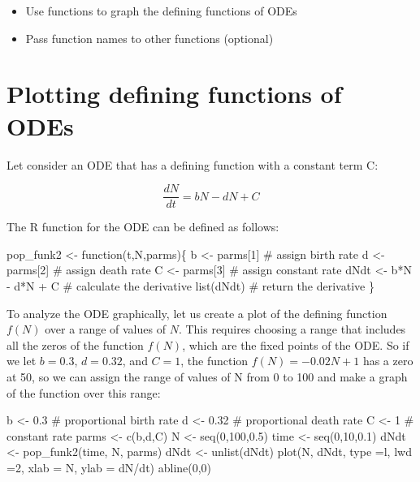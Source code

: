 \documentclass[
  letterpaper,
  DIV=11,
  numbers=noendperiod]{scrreprt}
\newenvironment{Shaded}{\begin{snugshade}}{\end{snugshade}}
\newcommand{\NormalTok}[1]{\textcolor[rgb]{0.00,0.23,0.31}{#1}}
\providecommand{\tightlist}{%
  \setlength{\itemsep}{0pt}\setlength{\parskip}{0pt}}\usepackage{longtable,booktabs,array}
\begin{document}
\begin{itemize}
\tightlist
\item
  Use functions to graph the defining functions of ODEs
\item
  Pass function names to other functions (optional)
\end{itemize}

\hypertarget{plotting-defining-functions-of-odes}{%
\section*{Plotting defining functions of
ODEs}\label{plotting-defining-functions-of-odes}}


Let consider an ODE that has a defining function with a constant term C:

\[ \frac{dN}{dt} = bN-dN + C\]

The R function for the ODE can be defined as follows:

\begin{Shaded}
\begin{Highlighting}[]
\NormalTok{pop\_funk2 \textless{}{-} function(t,N,parms)\{}
\NormalTok{  b \textless{}{-} parms[1] \# assign birth rate}
\NormalTok{  d \textless{}{-} parms[2] \# assign death rate}
\NormalTok{  C \textless{}{-} parms[3] \# assign constant rate}
\NormalTok{  dNdt \textless{}{-} b*N {-} d*N + C \# calculate the derivative}
\NormalTok{  list(dNdt) \# return the derivative}
\NormalTok{\}}
\end{Highlighting}
\end{Shaded}

To analyze the ODE graphically, let us create a plot of the defining
function \(f(N)\) over a range of values of \(N\). This requires
choosing a range that includes all the zeros of the function \(f(N)\),
which are the fixed points of the ODE. So if we let \(b=0.3\),
\(d=0.32\), and \(C=1\), the function \(f(N) = -0.02N+1\) has a zero at
50, so we can assign the range of values of N from 0 to 100 and make a
graph of the function over this range:

\begin{Shaded}
\begin{Highlighting}[]
\NormalTok{b \textless{}{-} 0.3 \# proportional birth rate}
\NormalTok{d \textless{}{-} 0.32 \# proportional death rate}
\NormalTok{C \textless{}{-} 1 \# constant rate}
\NormalTok{parms \textless{}{-} c(b,d,C)}
\NormalTok{N \textless{}{-} seq(0,100,0.5)}
\NormalTok{time \textless{}{-} seq(0,10,0.1)}
\NormalTok{dNdt \textless{}{-} pop\_funk2(time, N, parms)}
\NormalTok{dNdt \textless{}{-} unlist(dNdt)}
\NormalTok{plot(N, dNdt, type =\textquotesingle{}l\textquotesingle{}, lwd =2, }
\NormalTok{     xlab = \textquotesingle{}N\textquotesingle{}, ylab = \textquotesingle{}dN/dt\textquotesingle{})}
\NormalTok{abline(0,0)}
\end{Highlighting}
\end{Shaded}
\end{document}
